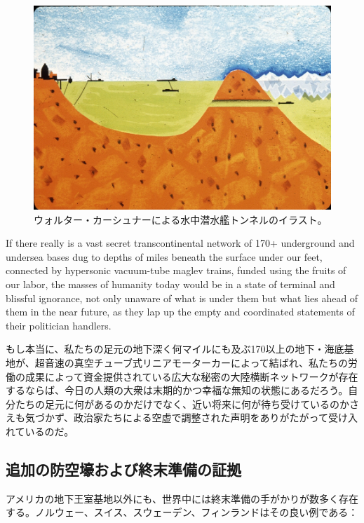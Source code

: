 \documentclass[10pt,twocolumn,letterpaper]{article}
\begin{document}
\begin{figure}[t]
\begin{center}
   \includegraphics[width=1\linewidth]{sub.jpg}
\end{center}
   \caption{ウォルター・カーシュナーによる水中潜水艦トンネルのイラスト\cite{22,23}。}
\label{fig:6}
\label{fig:onecol}
\end{figure}
If there really is a vast secret transcontinental network of 170+ underground and undersea bases dug to depths of miles beneath the surface under our feet, connected by hypersonic vacuum-tube maglev trains, funded using the fruits of our labor, the masses of humanity today would be in a state of terminal and blissful ignorance, not only unaware of what is under them but what lies ahead of them in the near future, as they lap up the empty and coordinated statements of their politician handlers.

もし本当に、私たちの足元の地下深く何マイルにも及ぶ170以上の地下・海底基地が、超音速の真空チューブ式リニアモーターカーによって結ばれ、私たちの労働の成果によって資金提供されている広大な秘密の大陸横断ネットワークが存在するならば、今日の人類の大衆は末期的かつ幸福な無知の状態にあるだろう。自分たちの足元に何があるのかだけでなく、近い将来に何が待ち受けているのかさえも気づかず、政治家たちによる空虚で調整された声明をありがたがって受け入れているのだ。

\subsection{追加の防空壕および終末準備の証拠}

アメリカの地下王室基地以外にも、世界中には終末準備の手がかりが数多く存在する。ノルウェー、スイス、スウェーデン、フィンランドはその良い例である：
\end{document}
